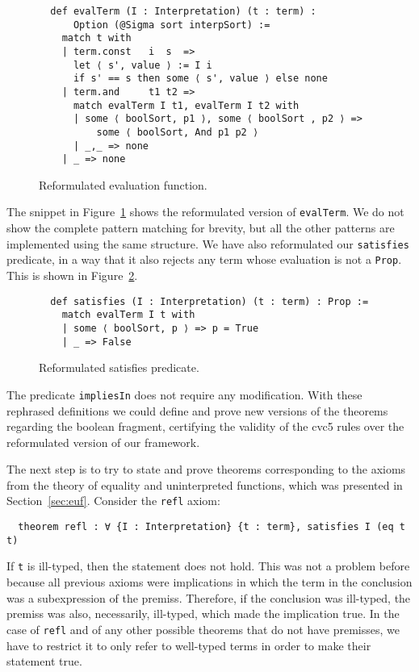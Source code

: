 \begin{figure}[t]
\begin{verbatim}
  def evalTerm (I : Interpretation) (t : term) :
      Option (@Sigma sort interpSort) :=
    match t with
    | term.const   i  s  =>
      let ⟨ s', value ⟩ := I i
      if s' == s then some ⟨ s', value ⟩ else none
    | term.and     t1 t2 =>
      match evalTerm I t1, evalTerm I t2 with
      | some ⟨ boolSort, p1 ⟩, some ⟨ boolSort , p2 ⟩ =>
          some ⟨ boolSort, And p1 p2 ⟩
      | _,_ => none
    | _ => none
\end{verbatim}
\caption{Reformulated evaluation function.}\label{evalTerm2}
\end{figure}

The snippet in Figure~\ref{evalTerm2} shows the reformulated version of \texttt{evalTerm}.
We do not show the complete pattern matching for brevity, but all the other
patterns are implemented using the same structure.
We have also reformulated our \texttt{satisfies} predicate, in a way that
it also rejects any term whose evaluation is not a \texttt{Prop}. This is shown
in Figure~\ref{satisfiesPred}.

\begin{figure}[t]
\begin{verbatim}
  def satisfies (I : Interpretation) (t : term) : Prop :=
    match evalTerm I t with
    | some ⟨ boolSort, p ⟩ => p = True
    | _ => False
\end{verbatim}
\caption{Reformulated satisfies predicate.}\label{satisfiesPred}
\end{figure}

The predicate \texttt{impliesIn} does not require any modification. With these
rephrased definitions we could define and prove new versions of
the theorems regarding the boolean fragment, certifying the validity of the
cvc5 rules over the reformulated version of our framework.

The next step is to try to state and prove theorems corresponding to the
axioms from the theory of equality and uninterpreted functions, which
was presented in Section~\ref{sec:euf}. Consider the \texttt{refl} axiom:

\begin{verbatim}
  theorem refl : ∀ {I : Interpretation} {t : term}, satisfies I (eq t t)
\end{verbatim}

If \texttt{t} is ill-typed, then the statement does not hold. This was not
a problem before because all previous axioms were implications in which
the term in the conclusion was a subexpression of the premiss. Therefore,
if the conclusion was ill-typed, the premiss was also, necessarily, ill-typed,
which made the implication true. In the case of \texttt{refl} and of
any other possible theorems that do not have premisses, we have to restrict it
to only refer to well-typed terms in order to make their statement true.

